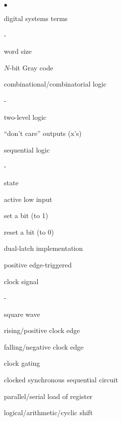 \begin{minipage}[t]{3in}
\begin{list}{$\bullet$}{\setlength{\itemsep}{0pt}\setlength{\parskip}{0pt}%
\setlength{\topsep}{0pt}\setlength{\partopsep}{0pt}\setlength{\parsep}{0pt}}
\item{digital systems terms}
\begin{list}{-}{\setlength{\itemsep}{0pt}\setlength{\parskip}{0pt}%
\setlength{\topsep}{0pt}\setlength{\partopsep}{0pt}\setlength{\parsep}{0pt}}
\item{word size}
\item{\mbox{$N$-bit} Gray code}
\item{combinational/combinatorial logic}
\begin{list}{-}{\setlength{\itemsep}{0pt}\setlength{\parskip}{0pt}%
\setlength{\topsep}{0pt}\setlength{\partopsep}{0pt}\setlength{\parsep}{0pt}}
\item{two-level logic}
\item{``don't care'' outputs (x's)}
\end{list}
\item{sequential logic}
\begin{list}{-}{\setlength{\itemsep}{0pt}\setlength{\parskip}{0pt}%
\setlength{\topsep}{0pt}\setlength{\partopsep}{0pt}\setlength{\parsep}{0pt}}
\item{state}
\item{active low input}
\item{set a bit (to 1)}
\item{reset a bit (to 0)}
%
%
\item{dual-latch implementation}
\item{positive edge-triggered}
\end{list}
\item{clock signal}
\begin{list}{-}{\setlength{\itemsep}{0pt}\setlength{\parskip}{0pt}%
\setlength{\topsep}{0pt}\setlength{\partopsep}{0pt}\setlength{\parsep}{0pt}}
\item{square wave}
\item{rising/positive clock edge}
\item{falling/negative clock edge}
\item{clock gating}
\end{list}
\item{clocked synchronous sequential circuit}
\item{parallel/serial load of register}
\item{logical/arithmetic/cyclic shift}
\end{list}


\end{list}

\end{minipage}\hspace{.25in}

\pagebreak

\mbox{~~~} %



\vfill

\pagebreak

